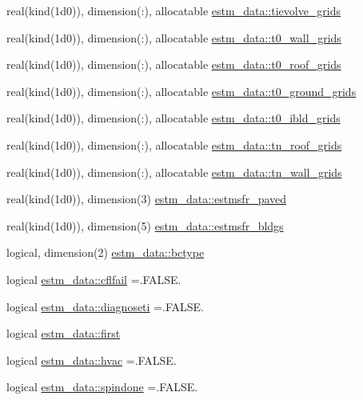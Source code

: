 \begin{DoxyCompactItemize}
real(kind(1d0)), dimension(\+:), allocatable \hyperlink{namespaceestm__data_aea3b637710882c735bbac0ace538e0f4}{estm\+\_\+data\+::tievolve\+\_\+grids}
\item 
real(kind(1d0)), dimension(\+:), allocatable \hyperlink{namespaceestm__data_a0c43cee9369acd3b8e32a0bcdad1882c}{estm\+\_\+data\+::t0\+\_\+wall\+\_\+grids}
\item 
real(kind(1d0)), dimension(\+:), allocatable \hyperlink{namespaceestm__data_a78c65d6ac3d89929a7ca5e553a486600}{estm\+\_\+data\+::t0\+\_\+roof\+\_\+grids}
\item 
real(kind(1d0)), dimension(\+:), allocatable \hyperlink{namespaceestm__data_a140b49398b8c4930bdb307f71603c827}{estm\+\_\+data\+::t0\+\_\+ground\+\_\+grids}
\item 
real(kind(1d0)), dimension(\+:), allocatable \hyperlink{namespaceestm__data_a746501ddba4d45a49ef9a65f7e668cd8}{estm\+\_\+data\+::t0\+\_\+ibld\+\_\+grids}
\item 
real(kind(1d0)), dimension(\+:), allocatable \hyperlink{namespaceestm__data_acf62443d4b1f09aedd9a2a08c8a1d3b1}{estm\+\_\+data\+::tn\+\_\+roof\+\_\+grids}
\item 
real(kind(1d0)), dimension(\+:), allocatable \hyperlink{namespaceestm__data_a5aa42393956ede1855e258e1943f27a2}{estm\+\_\+data\+::tn\+\_\+wall\+\_\+grids}
\item 
real(kind(1d0)), dimension(3) \hyperlink{namespaceestm__data_ae476f025b928a0aa7b7a57df9f0b253f}{estm\+\_\+data\+::estmsfr\+\_\+paved}
\item 
real(kind(1d0)), dimension(5) \hyperlink{namespaceestm__data_a8b2fa2867ca58a77b5dc128d74407658}{estm\+\_\+data\+::estmsfr\+\_\+bldgs}
\item 
logical, dimension(2) \hyperlink{namespaceestm__data_afa9b834a7e0defc816bb595ace6791f4}{estm\+\_\+data\+::bctype}
\item 
logical \hyperlink{namespaceestm__data_ac47c8fc3c7284a3308fe6b69ee8a5cc5}{estm\+\_\+data\+::cflfail} =.F\+A\+L\+S\+E.
\item 
logical \hyperlink{namespaceestm__data_a38be752511b3e4dcbb87c6152885d83b}{estm\+\_\+data\+::diagnoseti} =.F\+A\+L\+S\+E.
\item 
logical \hyperlink{namespaceestm__data_a24d84ca68dce8c57c22e0d7861609274}{estm\+\_\+data\+::first}
\item 
logical \hyperlink{namespaceestm__data_a6280dc53c8da5314be8c10ef13ead25e}{estm\+\_\+data\+::hvac} =.F\+A\+L\+S\+E.
\item 
logical \hyperlink{namespaceestm__data_af824dcc2de6123a45bb4267b0c55c56c}{estm\+\_\+data\+::spindone} =.F\+A\+L\+S\+E.

\end{DoxyCompactItemize}
